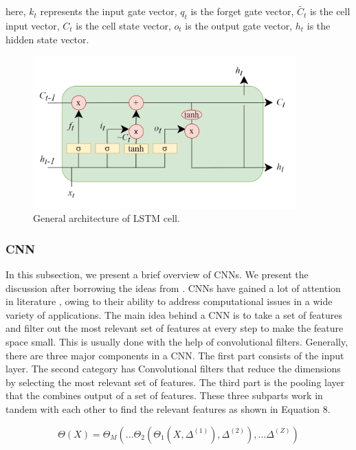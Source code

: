 here, $k_t$ represents the input gate vector, $q_t$ is the forget gate vector, $\tilde{C_t}$ is the  cell input vector, $C_t$ is the cell state vector, $o_t$ is the output gate vector, $h_t$ is the hidden state vector. 

\begin{figure}%
\centering
\includegraphics[width=0.9\textwidth]{lstm.png}
\caption{General architecture of LSTM cell.}
\label{lstm}
\end{figure}




\subsubsection{CNN}

In this subsection, we present a brief overview of CNNs. We present the discussion after borrowing the ideas from \cite{singh2020imbalanced}.
CNNs have gained a lot of attention in literature \cite{sinha2022sector}, \cite{miotto2018deep} owing to their ability to address computational issues in a wide variety of applications. The main idea behind a CNN is to take a set of features and filter out the most relevant set of features at every step to make the feature space small. This is usually done with the help of convolutional filters. Generally, there are three major components in a CNN. The first part consists of the input layer. The second category has Convolutional filters that reduce the dimensions by selecting the most relevant set of features. The third part is the pooling layer that the combines output of a set of features. These three subparts work in tandem with each other to find the relevant features as shown in Equation 8. 

\begin{equation}
\varTheta(X) = \varTheta_M (...\Theta_2(\Theta_1(X,\Delta^{(1)}),\Delta^{(2)}),...\Delta^{(Z)})
\end{equation}

